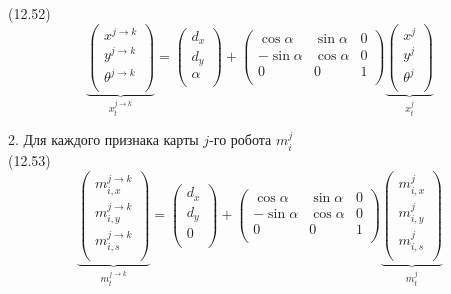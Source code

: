 \documentclass[10pt,a4paper]{article}
\begin{document}
(12.52)
$$\underbrace{\left(\begin{array}{c}x^{j\longrightarrow k}\\y^{j\longrightarrow k}\\\theta^{j\longrightarrow k}\\\end{array}\right)}_{x_t^{j\longrightarrow k}}=\left(\begin{array}{c}d_x\\d_y\\\alpha\\\end{array}\right)+\left(\begin{array}{ccc}\cos\alpha&\sin\alpha&0\\-\sin\alpha&\cos\alpha&0\\0&0&1\\\end{array}\right)\underbrace{\left(\begin{array}{c}x^j\\y^j\\\theta^j\\\end{array}\right)}_{x_t^j}$$

2.	Для каждого признака карты $j$-го робота $m_i^j$\\

(12.53)
$$\underbrace{\left(\begin{array}{c}m^{j\longrightarrow k}_{i,x}\\m^{j\longrightarrow k}_{i,y}\\m^{j\longrightarrow k}_{i,s}\\\end{array}\right)}_{m_t^{j\longrightarrow k}}=\left(\begin{array}{c}d_x\\d_y\\0\\\end{array}\right)+\left(\begin{array}{ccc}\cos\alpha&\sin\alpha&0\\-\sin\alpha&\cos\alpha&0\\0&0&1\\\end{array}\right)\underbrace{\left(\begin{array}{c}m^j_{i,x}\\m^j_{i,y}\\m^j_{i,s}\\\end{array}\right)}_{m_t^j}$$
\end{document}
